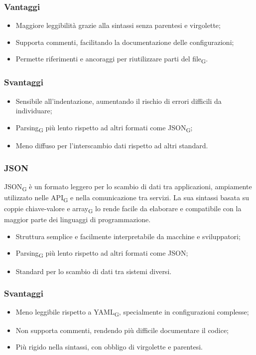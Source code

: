 \subsubsection{Vantaggi}
\begin{itemize}
    \item Maggiore leggibilità grazie alla sintassi senza parentesi e virgolette;
    \item Supporta commenti, facilitando la documentazione delle configurazioni;
    \item Permette riferimenti e ancoraggi per riutilizzare parti del file\textsubscript{G}.
\end{itemize}
\subsubsection{Svantaggi}
\begin{itemize}
    \item Sensibile all’indentazione, aumentando il rischio di errori difficili da individuare;
    \item Parsing\textsubscript{G} più lento rispetto ad altri formati come JSON\textsubscript{G};
    \item Meno diffuso per l’interscambio dati rispetto ad altri standard.
\end{itemize}

\subsubsection{JSON}
JSON\textsubscript{G} è un formato leggero per lo scambio di dati tra applicazioni, ampiamente utilizzato nelle API\textsubscript{G} e nella comunicazione tra servizi. La sua sintassi basata su coppie chiave-valore e array\textsubscript{G} lo rende facile da elaborare e compatibile con la maggior parte dei linguaggi di programmazione.
\begin{itemize}
    \item Struttura semplice e facilmente interpretabile da macchine e sviluppatori;
    \item Parsing\textsubscript{G} più lento rispetto ad altri formati come JSON;
    \item Standard per lo scambio di dati tra sistemi diversi.
\end{itemize}
\subsubsection{Svantaggi}
\begin{itemize}
    \item Meno leggibile rispetto a YAML\textsubscript{G}, specialmente in configurazioni complesse;
    \item Non supporta commenti, rendendo più difficile documentare il codice;
    \item Più rigido nella sintassi, con obbligo di virgolette e parentesi.
\end{itemize}